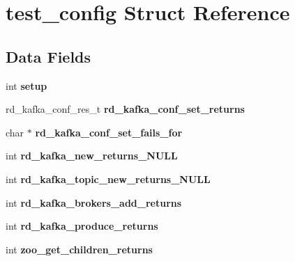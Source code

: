\hypertarget{structtest__config}{\section{test\-\_\-config \-Struct \-Reference}
\label{structtest__config}
}
\subsection*{\-Data \-Fields}
\begin{DoxyCompactItemize}
\item 
\hypertarget{structtest__config_a3942b32032a000171742f126e13607d2}{int {\bfseries setup}}\label{structtest__config_a3942b32032a000171742f126e13607d2}

\item 
\hypertarget{structtest__config_a5874c7e35af748ee2da2dc2aad4ec903}{rd\-\_\-kafka\-\_\-conf\-\_\-res\-\_\-t {\bfseries rd\-\_\-kafka\-\_\-conf\-\_\-set\-\_\-returns}}\label{structtest__config_a5874c7e35af748ee2da2dc2aad4ec903}

\item 
\hypertarget{structtest__config_a13b45e925e2241e87ce751646f730be0}{char $\ast$ {\bfseries rd\-\_\-kafka\-\_\-conf\-\_\-set\-\_\-fails\-\_\-for}}\label{structtest__config_a13b45e925e2241e87ce751646f730be0}

\item 
\hypertarget{structtest__config_a0e09841bad2767e40180e1779db2d58c}{int {\bfseries rd\-\_\-kafka\-\_\-new\-\_\-returns\-\_\-\-N\-U\-L\-L}}\label{structtest__config_a0e09841bad2767e40180e1779db2d58c}

\item 
\hypertarget{structtest__config_aadee747b7f4c1523707dc80ced66c06a}{int {\bfseries rd\-\_\-kafka\-\_\-topic\-\_\-new\-\_\-returns\-\_\-\-N\-U\-L\-L}}\label{structtest__config_aadee747b7f4c1523707dc80ced66c06a}

\item 
\hypertarget{structtest__config_a6e20e3761d982cf3804eb7be5149a2b5}{int {\bfseries rd\-\_\-kafka\-\_\-brokers\-\_\-add\-\_\-returns}}\label{structtest__config_a6e20e3761d982cf3804eb7be5149a2b5}

\item 
\hypertarget{structtest__config_a6f7d96df9bfb99390aa635464437df3e}{int {\bfseries rd\-\_\-kafka\-\_\-produce\-\_\-returns}}\label{structtest__config_a6f7d96df9bfb99390aa635464437df3e}

\item 
\hypertarget{structtest__config_a6743877a0c30740ab3c1de3903291d88}{int {\bfseries zoo\-\_\-get\-\_\-children\-\_\-returns}}\label{structtest__config_a6743877a0c30740ab3c1de3903291d88}


\end{DoxyCompactItemize}
